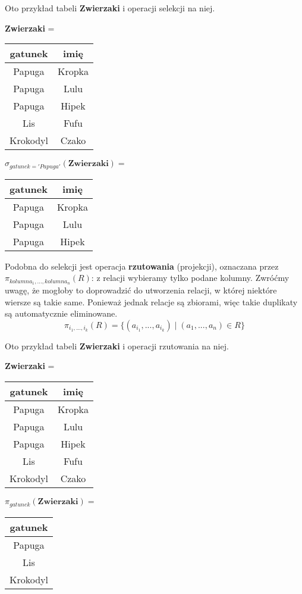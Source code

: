 \begin{example}
    Oto przykład tabeli \textbf{Zwierzaki} i operacji selekcji na niej.
    \begin{center}
        \textbf{Zwierzaki} =
        \begin{tabular}{c|c}
            gatunek & imię \\ \hline
            Papuga & Kropka \\
            Papuga & Lulu \\
            Papuga & Hipek \\
            Lis & Fufu \\
            Krokodyl & Czako \\
        \end{tabular}
        \qquad $\sigma_{gatunek = 'Papuga'}(\textbf{Zwierzaki}) = $
        \begin{tabular}{c|c}
            gatunek & imię \\ \hline
            Papuga & Kropka \\
            Papuga & Lulu \\
            Papuga & Hipek \\
        \end{tabular}
    \end{center}
\end{example}

Podobna do selekcji jest operacja \textbf{rzutowania} (projekcji), oznaczana przez $\pi_{kolumna_1, ..., kolumna_n}(R)$: z relacji wybieramy tylko podane kolumny. Zwróćmy uwagę, że mogłoby to doprowadzić do utworzenia relacji, w której niektóre wiersze są takie same. Ponieważ jednak relacje są zbiorami, więc takie duplikaty są automatycznie eliminowane.
$$\pi_{i_1, ..., i_k}(R) = \{(a_{i_1}, ..., a_{i_k}) \; | \; (a_1, ..., a_n) \in R \}$$

\begin{example}
    Oto przykład tabeli \textbf{Zwierzaki} i operacji rzutowania na niej.
    \begin{center}
        \textbf{Zwierzaki} =
        \begin{tabular}{c|c}
            gatunek & imię \\ \hline
            Papuga & Kropka \\
            Papuga & Lulu \\
            Papuga & Hipek \\
            Lis & Fufu \\
            Krokodyl & Czako \\
        \end{tabular}
        \qquad $\pi_{gatunek}(\textbf{Zwierzaki}) = $
        \begin{tabular}{c}
            gatunek \\ \hline
            Papuga \\
            Lis \\
            Krokodyl \\
        \end{tabular}
    \end{center}
\end{example}

